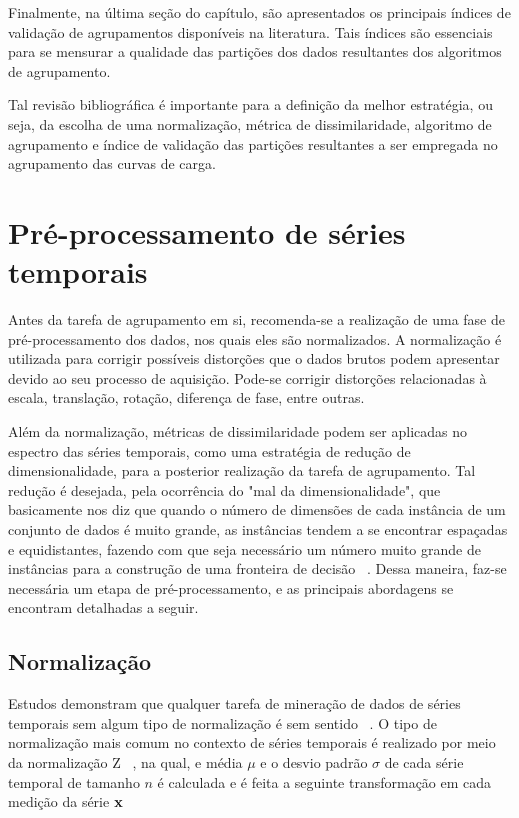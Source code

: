 Finalmente, na última seção do capítulo, são apresentados os principais índices de validação de agrupamentos disponíveis na literatura. Tais índices são essenciais para se mensurar a qualidade das partições dos dados resultantes dos algoritmos de agrupamento.

Tal revisão bibliográfica é importante para a definição da melhor estratégia, ou seja, da escolha de uma normalização, métrica de dissimilaridade, algoritmo de agrupamento e índice de validação das partições resultantes a ser empregada no agrupamento das curvas de carga.

\section{Pré-processamento de séries temporais}

Antes da tarefa de agrupamento em si, recomenda-se a realização de uma fase de pré-processamento dos dados, nos quais eles são normalizados. A normalização é utilizada para corrigir possíveis distorções que o dados brutos podem apresentar devido ao seu processo de aquisição. Pode-se corrigir distorções relacionadas à escala, translação, rotação, diferença de fase, entre outras.

Além da normalização, métricas de dissimilaridade podem ser aplicadas no espectro das séries temporais, como uma estratégia de redução de dimensionalidade, para a posterior realização da tarefa de agrupamento. Tal redução é desejada, pela ocorrência do "mal da dimensionalidade", que basicamente nos diz que quando o número de dimensões de cada instância de um conjunto de dados é muito grande, as instâncias tendem a se encontrar espaçadas e equidistantes, fazendo com que seja necessário um número muito grande de instâncias para a construção de uma fronteira de decisão ~\parencite{DudaHart}. Dessa maneira, faz-se necessária um etapa de pré-processamento, e as principais abordagens se encontram detalhadas a seguir.

\subsection{Normalização} \label{sec:norm_Z}

Estudos demonstram que qualquer tarefa de mineração de dados de séries temporais sem algum tipo de normalização é sem sentido ~\parencite{Keogh_need_norm}. O tipo de normalização mais comum no contexto de séries temporais é realizado por meio da normalização Z ~\parencite{trillions}, na qual, e média $\mu$ e o desvio padrão $\sigma$ de cada série temporal de tamanho $n$ é calculada e é feita a seguinte transformação em cada medição da série $\bf{x}$

